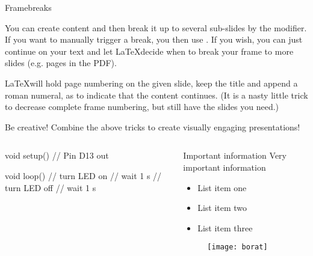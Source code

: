 \documentclass{beamer}
\begin{document}
\begin{frame}[allowframebreaks]{Framebreaks}

You can create content and then break it up to several sub-slides by the  modifier. If you want to manually trigger a break, you then use . If you wish, you can just continue on your text and let \LaTeX decide when to break your frame to more slides (e.g. pages in the PDF).

\framebreak

\LaTeX will hold page numbering on the given slide, keep the title and append a roman numeral, as to indicate that the content continues. (It is a nasty little trick to decrease complete frame numbering, but still have the slides you need.)

\end{frame}


\begin{frame}[fragile]{Be creative!}
Combine the above tricks to create visually engaging presentations!
\begin{columns}[T] %
\begin{column}{.48\textwidth}
\begin{ardu}
void setup() {
     // Pin D13 out
}

void loop() {
     // turn LED on
     // wait 1 s
     // turn LED off
     // wait 1 s
}
\end{ardu}
\end{column}
\begin{column}{.48\textwidth}
\begin{block}{Important information}
Very important information
\end{block}
\begin{itemize}
\item List item one
\item List item two
\item List item three
\end{itemize}
\begin{figure}
\centering
  \texttt{[image: borat]}\\
\end{figure}
\end{column}%
\end{columns}
\end{frame}
\end{document}

